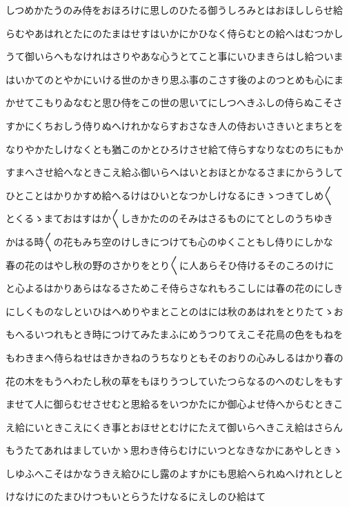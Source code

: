 \documentclass[a4paper,11pt,landscape]{ltjtarticle}
\begin{document}
しつめかたうのみ侍をおほろけに思しのひたる御うしろみとはおほししらせ給
\par\medskip
らむやあはれとたにのたまはせすはいかにかひなく侍らむとの給へはむつかし
\par\medskip
うて御いらへもなけれはさりやあな心うとてこと事にいひまきらはし給ついま
\par\medskip
はいかてのとやかにいける世のかきり思ふ事のこさす後のよのつとめも心にま
\par\medskip
かせてこもりゐなむと思ひ侍をこの世の思いてにしつへきふしの侍らぬこそさ
\par\medskip
すかにくちおしう侍りぬへけれかならすおさなき人の侍おいさきいとまちとを
\par\medskip
なりやかたしけなくとも猶このかとひろけさせ給て侍らすなりなむのちにもか
\par\medskip
すまへさせ給へなときこえ給ふ御いらへはいとおほとかなるさまにからうして
\par\medskip
ひとことはかりかすめ給へるけはひいとなつかしけなるにきゝつきてしめ〱
\par\medskip
とくるゝまておはすはか〱しきかたののそみはさるものにてとしのうちゆき
\par\medskip
かはる時〱の花もみち空のけしきにつけても心のゆくこともし侍りにしかな
\par\medskip
春の花のはやし秋の野のさかりをとり〱に人あらそひ侍けるそのころのけに
\par\medskip
と心よるはかりあらはなるさためこそ侍らさなれもろこしには春の花のにしき
\par\medskip
にしくものなしといひはへめりやまとことのはには秋のあはれをとりたてゝお
\par\medskip
もへるいつれもとき時につけてみたまふにめうつりてえこそ花鳥の色をもねを
\par\medskip
もわきまへ侍らねせはきかきねのうちなりともそのおりの心みしるはかり春の
\par\medskip
花の木をもうへわたし秋の草をもほりうつしていたつらなるのへのむしをもす
\par\medskip
ませて人に御らむせさせむと思給るをいつかたにか御心よせ侍へからむときこ
\par\medskip
え給にいときこえにくき事とおほせとむけにたえて御いらへきこえ給はさらん
\par\medskip
もうたてあれはましていかゝ思わき侍らむけにいつとなきなかにあやしときゝ
\par\medskip
しゆふへこそはかなうきえ給ひにし露のよすかにも思給へられぬへけれとしと
\par\medskip
けなけにのたまひけつもいとらうたけなるにえしのひ給はて
\end{document}
